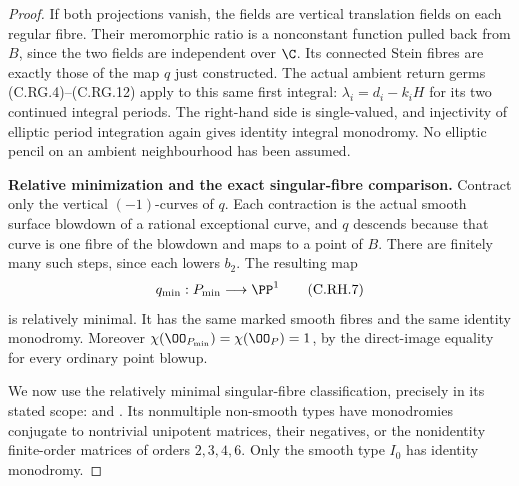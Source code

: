 \begin{proof}
If both projections vanish,
the fields are vertical translation
fields on each regular fibre.
Their meromorphic ratio is a
nonconstant function pulled
back from \(B\), since the two
fields are independent over
\(\C\). Its connected Stein
fibres are exactly those of
the map \(q\) just constructed.
The actual ambient return germs
(C.RG.4)--(C.RG.12) apply to
this same first integral:
\(\lambda_i=d_i-k_iH\) for its
two continued integral periods.
The right-hand side is
single-valued, and injectivity
of elliptic period integration
again gives identity integral
monodromy. No elliptic pencil
on an ambient neighbourhood
has been assumed.

\par\medskip\noindent\textbf{Relative minimization and the exact singular-fibre comparison.}
Contract only the vertical
\((-1)\)-curves of \(q\).
Each contraction is the
actual smooth surface
blowdown of a rational
exceptional curve, and \(q\)
descends because that curve
is one fibre of the blowdown
and maps to a point of \(B\).
There are finitely many such
steps, since each lowers
\(b_2\). The resulting map
\[
               q_{\min}:P_{\min}\longrightarrow\PP^1
 \tag{C.RH.7}\label{cdp:eq:C.RH.7}
\]
is relatively minimal. It
has the same marked smooth
fibres and the same identity
monodromy. Moreover
\(\chi(\OO_{P_{\min}})=\chi(\OO_P)=1\),
by the direct-image equality
for every ordinary point
blowup.

We now use the relatively
minimal singular-fibre
classification, precisely in
its stated scope:
\cite[Theorem~6.2; Section~8(iv)(11), p.~585]{Kodaira1963II} and \citet[Section~2.3, pp.~5--6]{UlmerUrzua2021}.
Its nonmultiple non-smooth
types have monodromies
conjugate to nontrivial
unipotent matrices, their
negatives, or the nonidentity
finite-order matrices of
orders \(2,3,4,6\).
Only the smooth type \(I_0\)
has identity monodromy.


\end{proof}
